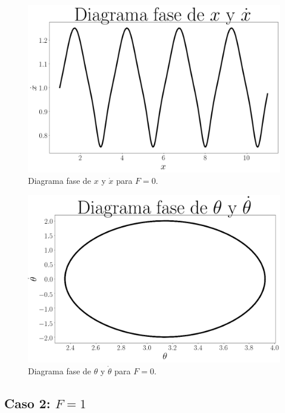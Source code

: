 \documentclass[12pt,letterpaper]{article}
\begin{document}
\begin{figure}[h]
 \centering
 \includegraphics[scale=0.2]{img/dp_phase_x_dx_f0.png}
 \caption{Diagrama fase de $x$ y $\dot{x}$ para $F=0$.}
 \label{fig: dp phase x dx force 0}
\end{figure}

\begin{figure}[h]
 \centering
 \includegraphics[scale=0.2]{img/dp_phase_theta_dtheta_f0.png}
\caption{Diagrama fase de $\theta$ y $\dot{\theta}$ para $F=0$.}
 \label{fig: dp phase theta dtheta force 0}
\end{figure}

\pagebreak

\subsection{Caso 2: $F=1$}
\end{document}
